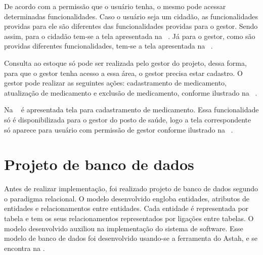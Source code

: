 %

De acordo com a permissão que o usuário tenha, o mesmo pode acessar determinadas funcionalidades. Caso o usuário seja um cidadão, as funcionalidades providas para ele são diferentes das funcionalidades providas para o gestor. Sendo assim, para o cidadão tem-se a tela apresentada na ~. Já para o gestor, como são providas diferentes funcionalidades, tem-se a tela apresentada na ~.

%

Consulta ao estoque só pode ser realizada pelo gestor do projeto, dessa forma, para que o gestor tenha acesso a essa área, o gestor precisa estar cadastro. O gestor pode realizar as seguintes ações: cadastramento de medicamento, atualização de medicamento e exclusão de medicamento, conforme ilustrado na ~.


%

Na ~ é apresentada tela para cadastramento de medicamento. Essa funcionalidade só é disponibilizada para o gestor do posto de saúde, logo a tela correspondente só aparece para usuário com permissão de gestor conforme ilustrado na ~. 


\section{Projeto de banco de dados}


Antes de realizar implementação, foi realizado projeto de banco de dados segundo o paradigma relacional. O modelo desenvolvido engloba entidades, atributos de entidades e relacionamentos entre entidades. Cada entidade é representada por tabela e tem os seus relacionamentos representados por ligações entre tabelas. 
O modelo desenvolvido auxiliou na implementação do sistema de software. Esse modelo de banco de dados foi desenvolvido usando-se a ferramenta do Astah, e se encontra na .

%

